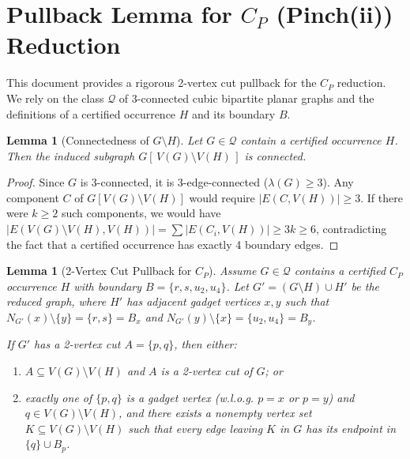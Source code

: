 \documentclass[12pt]{article}
\newtheorem{lemma}[theorem]{Lemma}
\begin{document}
\section*{Pullback Lemma for $C_P$ (Pinch(ii)) Reduction}

This document provides a rigorous 2-vertex cut pullback for the $C_P$ reduction.
We rely on the class $\mathcal{Q}$ of 3-connected cubic bipartite planar graphs and the definitions of a certified occurrence $H$ and its boundary $B$.

\begin{lemma}[Connectedness of $G \setminus H$]
\label{lem:isolated_neighborhood}
Let $G \in \mathcal{Q}$ contain a certified occurrence $H$. Then the induced subgraph $G[\,V(G)\setminus V(H)\,]$ is connected.
\end{lemma}
\begin{proof}
Since $G$ is 3-connected, it is 3-edge-connected ($\lambda(G) \ge 3$). Any component $C$ of $G[V(G)\setminus V(H)]$ would require $|E(C, V(H))| \ge 3$. If there were $k \ge 2$ such components, we would have $|E(V(G)\setminus V(H), V(H))| = \sum |E(C_i, V(H))| \ge 3k \ge 6$, contradicting the fact that a certified occurrence has exactly 4 boundary edges.
\end{proof}

\begin{lemma}[2-Vertex Cut Pullback for $C_P$]
\label{lem:pullback_cut_CP}
Assume $G \in \mathcal{Q}$ contains a certified $C_P$ occurrence $H$ with boundary $B = \{r, s, u_2, u_4\}$. Let $G' = (G \setminus H) \cup H'$ be the reduced graph, where $H'$ has adjacent gadget vertices $x, y$ such that $N_{G'}(x) \setminus \{y\} = \{r, s\} = B_x$ and $N_{G'}(y) \setminus \{x\} = \{u_2, u_4\} = B_y$.

If $G'$ has a 2-vertex cut $A = \{p, q\}$, then either:
\begin{enumerate}
    \item[(i)] $A \subseteq V(G) \setminus V(H)$ and $A$ is a 2-vertex cut of $G$; or
    \item[(ii)] exactly one of $\{p, q\}$ is a gadget vertex (w.l.o.g. $p=x$ or $p=y$) and $q \in V(G) \setminus V(H)$, and there exists a nonempty vertex set $K \subseteq V(G) \setminus V(H)$ such that every edge leaving $K$ in $G$ has its endpoint in $\{q\} \cup B_p$.
\end{enumerate}
\end{lemma}
\end{document}
